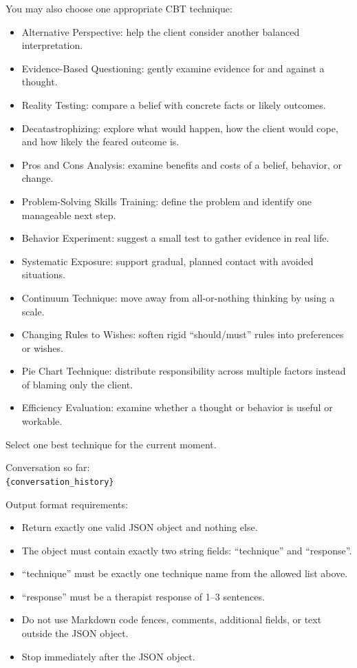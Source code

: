 \begin{tcolorbox}[
    breakable,
    colback=gray!10,
    colframe=gray!40,
    boxrule=0.5pt,
    arc=3mm,
    left=4mm, right=4mm, top=3mm, bottom=3mm
]
You may also choose one appropriate CBT technique:
\begin{itemize}[itemsep=0pt,parsep=0pt,topsep=2pt]
    \item Alternative Perspective: help the client consider another balanced interpretation.
    \item Evidence-Based Questioning: gently examine evidence for and against a thought.
    \item Reality Testing: compare a belief with concrete facts or likely outcomes.
    \item Decatastrophizing: explore what would happen, how the client would cope, and how likely the feared outcome is.
    \item Pros and Cons Analysis: examine benefits and costs of a belief, behavior, or change.
    \item Problem-Solving Skills Training: define the problem and identify one manageable next step.
    \item Behavior Experiment: suggest a small test to gather evidence in real life.
    \item Systematic Exposure: support gradual, planned contact with avoided situations.
    \item Continuum Technique: move away from all-or-nothing thinking by using a scale.
    \item Changing Rules to Wishes: soften rigid ``should/must'' rules into preferences or wishes.
    \item Pie Chart Technique: distribute responsibility across multiple factors instead of blaming only the client.
    \item Efficiency Evaluation: examine whether a thought or behavior is useful or workable.
\end{itemize}
\par\medskip

Select one best technique for the current moment.

Conversation so far:\\
\texttt{\{conversation\_history\}}

Output format requirements:
\begin{itemize}[itemsep=0pt,parsep=0pt,topsep=2pt]
    \item Return exactly one valid JSON object and nothing else.
    \item The object must contain exactly two string fields: ``technique'' and ``response''.
    \item ``technique'' must be exactly one technique name from the allowed list above.
    \item ``response'' must be a therapist response of 1--3 sentences.
    \item Do not use Markdown code fences, comments, additional fields, or text outside the JSON object.
    \item Stop immediately after the JSON object.
\end{itemize}
\par\medskip


\end{tcolorbox}
